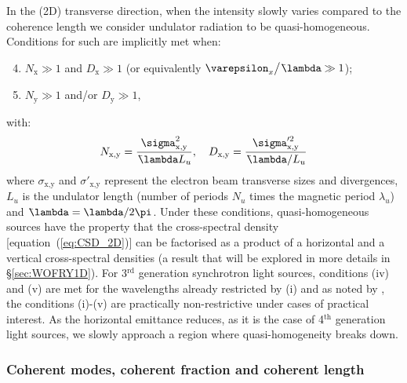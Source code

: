 \documentclass{iucr}              %
\newcommand{\lambdabar}{{\mkern0.75mu\mathchar '26\mkern -8.2mu\lambda}}
\begin{document}
In the (2D) transverse direction, when the intensity slowly varies compared to the coherence length we consider undulator radiation to be quasi-homogeneous. Conditions for such are implicitly met when: 
\begin{enumerate}%
\setcounter{enumi}{3}
\item $N_\text{x}\gg1$ and $D_\text{x}\gg1$ (or equivalently $\varepsilon_x\big/\lambdabar\gg1$);
\item $N_\text{y}\gg1$ and/or $D_\text{y}\gg1$,
\end{enumerate}
with:
\begin{equation}
    N_\text{x,y}=\frac{\sigma^2_\text{x,y}}{\lambdabar L_u}, \quad D_\text{x,y}=\frac{\sigma'^2_\text{x,y}}{\lambdabar/L_u}
\end{equation}
where $\sigma_\text{x,y}$ and $\sigma'_\text{x,y}$ represent the electron beam transverse sizes and divergences, $L_u$ is the undulator length (number of periods $N_u$ times the magnetic period $\lambda_u$) and $\lambdabar=\lambda/2\pi$.
Under these conditions, quasi-homogeneous sources have the property that the cross-spectral density [equation~(\ref{eq:CSD_2D})] can be factorised as a product of a horizontal and a vertical cross-spectral densities (a result that will be explored in more details in \S\ref{sec:WOFRY1D}). For 3$^{\text{rd}}$ generation synchrotron light sources, conditions (iv) and (v) are met for the wavelengths already restricted by (i) and as noted by , the conditions (i)-(v) are practically non-restrictive under cases of practical interest. As the horizontal emittance reduces, as it is the case of 4$^{\text{th}}$ generation light sources, we slowly approach a region where quasi-homogeneity breaks down.

\subsubsection{Coherent modes, coherent fraction and coherent length\\}
\end{document}
